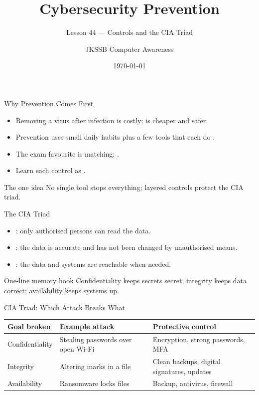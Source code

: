 \documentclass[aspectratio=169]{beamer}
\title{Cybersecurity Prevention}
\subtitle{Lesson 44 --- Controls and the CIA Triad}
\author{JKSSB Computer Awareness}
\date{\today}
\begin{document}
\frame{\titlepage}

\begin{frame}{Why Prevention Comes First}
  \begin{itemize}
    \item Removing a virus after infection is costly; 
      is cheaper and safer.
    \item Prevention uses small daily habits plus a few tools that each do
      .
    \item The exam favourite is matching: .
    \item Learn each control as .
  \end{itemize}
  \begin{block}{The one idea}
    No single tool stops everything; layered controls protect the CIA triad.
  \end{block}
\end{frame}

\begin{frame}{The CIA Triad}
  \begin{itemize}
    \item {}: only authorised persons can read the data.
    \item {}: the data is accurate and has not been changed by
      unauthorised means.
    \item {}: the data and systems are reachable when needed.
  \end{itemize}
  \begin{block}{One-line memory hook}
    Confidentiality keeps secrets secret; integrity keeps data correct;
    availability keeps systems up.
  \end{block}
\end{frame}

\begin{frame}{CIA Triad: Which Attack Breaks What}
  \begin{center}
    \small
    \begin{tabular}{p{}p{}p{}}
      \toprule
      \textbf{Goal broken} & \textbf{Example attack} & \textbf{Protective control} \\
      \midrule
      Confidentiality & Stealing passwords over open Wi-Fi & Encryption, strong passwords, MFA \\
      Integrity & Altering marks in a file & Clean backups, digital signatures, updates \\
      Availability & Ransomware locks files & Backup, antivirus, firewall \\
      \bottomrule
    \end{tabular}
  \end{center}
  \vspace{0.25cm}
\end{frame}
\end{document}
